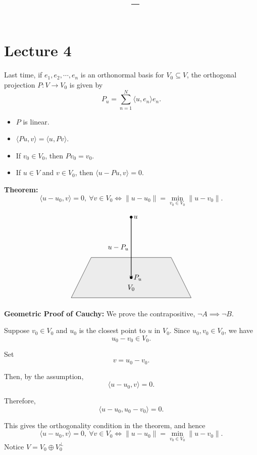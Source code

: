 \documentclass[11pt]{article}
\title{\vspace{-1.5em}\textbf{\coursename\ -- \lecturetitle}}
\author{\studentname}
\date{\lecturedate}
\newcommand{\1}{\mathbf{1}}
\theoremstyle{notestyle}
\theoremstyle{definition}
\begin{document}
\maketitle

\section{Lecture 4}
Last time, if $e_1,e_2,\cdots,e_n$ is an orthonormal basis for $V_0\subseteq V$, the orthogonal projection $P:V\rightarrow V_0$ is given by
$$
P_u=\sum_{n=1}^{N}\langle u,e_n\rangle e_n.
$$

\begin{itemize}
    \item $P$ is linear.
    \item $\langle Pu,v\rangle=\langle u,Pv\rangle$.
    \item If $v_0\in V_0$, then $Pv_0=v_0$.
    \item If $u\in V$ and $v\in V_0$, then $\langle u-Pu,v\rangle=0$.
\end{itemize}

\textbf{Theorem:}
$$
\langle u-u_0,v\rangle=0,\ \forall v\in V_0
\iff
\|u-u_0\|=\min_{v_0\in V_0}\|u-v_0\|.
$$

\[
\begin{tikzpicture}
    \fill[gray!15] (-3,-1) -- (3,-1) -- (2,1) -- (-2,1) -- cycle;
    \draw (-3,-1) -- (3,-1);
    \draw (3,-1) -- (2,1);
    \draw (2,1) -- (-2,1);
    \draw (-2,1) -- (-3,-1);

    \draw[->, thick] (0,3) -- (0,0);

    \fill (0,3) circle (2pt) node[right] {$u$};
    \fill (0,0) circle (2pt) node[right] {$P_u$};

    \node at (0,-0.5) {$V_0$};
    \node[left] at (0,1.5) {$u-P_u$};
\end{tikzpicture}
\]

\textbf{Geometric Proof of Cauchy:} 
We prove the contrapositive, $\neg A\implies\neg B$.

Suppose $v_0\in V_0$ and $u_0$ is the closest point to $u$ in $V_0$. Since $u_0,v_0\in V_0$, we have
$$
u_0-v_0\in V_0.
$$

Set
$$
v=u_0-v_0.
$$

Then, by the assumption,
$$
\langle u-u_0,v\rangle=0.
$$

Therefore,
$$
\langle u-u_0,u_0-v_0\rangle=0.
$$

This gives the orthogonality condition in the theorem, and hence
$$
\langle u-u_0,v\rangle=0,\ \forall v\in V_0
\iff
\|u-u_0\|=\min_{v_0\in V_0}\|u-v_0\|.
$$
Notice $V = V_0 \oplus V_0^{\perp}$
\end{document}
